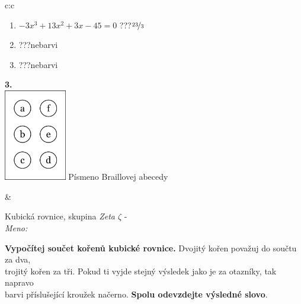 \documentclass[10pt]{report}
\begin{document}
\begin{tabular}{c:c}
\begin{minipage}[c][104.5mm][t]{0.5\linewidth}
\begin{center}
\begin{minipage}{0.79\linewidth}
\begin{center}
\begin{varwidth}{\linewidth}
\begin{enumerate}
\item $-3x^3+13x^2+3x-45=0$\quad \dotfill\; ???\;\dotfill \quad $\nicefrac{23}{3}$
\item \quad \dotfill\; ???\;\dotfill \quad nebarvi
\item \quad \dotfill\; ???\;\dotfill \quad nebarvi
\end{enumerate}
\end{varwidth}
\end{center}
\end{minipage}
\begin{minipage}{0.20\linewidth}
\begin{center}
{\Huge\bfseries 3.} \\[2mm]
\includegraphics[height=40mm]{../images/braille.png}
{\small Písmeno Braillovej abecedy}
\end{center}
\end{minipage}
\end{center}
\end{minipage}
&
\begin{minipage}[c][104.5mm][t]{0.5\linewidth}
\begin{center}
\vspace{7mm}
{\huge Kubická rovnice, skupina \textit{Zeta $\zeta$} -}\\[5mm]
\textit{Meno:}\phantom{xxxxxxxxxxxxxxxxxxxxxxxxxxxxxxxxxxxxxxxxxxxxxxxxxxxxxxxxxxxxxxxxx}\\[5mm]
\begin{minipage}{0.95\linewidth}
\textbf{Vypočítej součet kořenů kubické rovnice.} Dvojitý kořen považuj do součtu za dva,\\trojitý kořen za tři. Pokud ti vyjde stejný výsledek jako je za otazníky, tak napravo\\barvi příslušející kroužek načerno. \textbf{Spolu odevzdejte výsledné slovo}.
\end{minipage}
\\[1mm]
\begin{minipage}{0.79\linewidth}
\begin{center}
\begin{varwidth}{\linewidth}

\end{varwidth}
\end{center}
\end{minipage}
\end{center}
\end{minipage}
\end{tabular}
\end{document}
